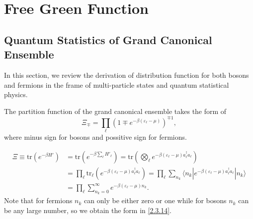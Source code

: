 \documentclass[b5paper,10pt,UTF8]{book}
\numberwithin{equation}{section}
\begin{document}
	\section{Free Green Function}
		\subsection{Quantum Statistics of Grand Canonical Ensemble}
		In this section, we review the derivation of distribution function for both bosons and fermions in the frame of multi-particle states and quantum statistical physics.
		\begin{Lemma}
			The partition function of the grand canonical ensemble takes the form of
			\begin{equation}\label{2.3.14}
				\varXi_{\mp}=\prod_\ell(1\mp e^{-\beta(\varepsilon_\ell-\mu)})^{\mp1},
			\end{equation}
			where minus sign for bosons and possitive sign for fermions.
		\end{Lemma}
		\begin{Proof}
		\begin{align*}
			\varXi\equiv\mathrm{tr}(e^{-\beta H'})&=\mathrm{tr}\left(e^{-\beta \sum_\ell H'_\ell}\right)=\mathrm{tr}\left(\bigotimes_{\ell}e^{-\beta(\varepsilon_\ell-\mu)a_\ell^\dagger a_\ell}\right)\\
			&=\prod_{\ell}\mathrm{tr}_\ell\left(e^{-\beta(\varepsilon_\ell-\mu)a_\ell^\dagger a_\ell}\right)=\prod_\ell\sum_{n_k}\langle n_k|e^{-\beta(\varepsilon_\ell-\mu)a_\ell^\dagger a_\ell}|n_k\rangle\\
			&=\prod_{\ell}\sum_{n_k=0}^\infty e^{-\beta(\varepsilon_\ell-\mu)n_k}.
		\end{align*}
		Note that for fermions $n_k$ can only be either zero or one while for bosons $n_k$ can be any large number, so we obtain the form in \eqref{2.3.14}.
		\end{Proof}
		
\end{document}

